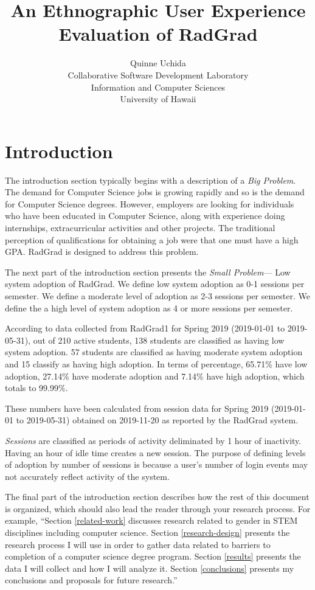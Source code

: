 \documentclass[english]{proposalnsf}
\title{An Ethnographic User Experience Evaluation of RadGrad}
\author{Quinne Uchida \\Collaborative Software Development Laboratory \\ Information and Computer Sciences \\ University of Hawaii}
\begin{document}
\maketitle
\tableofcontents
\newpage

\section{Introduction}
\label{introduction}

The introduction section typically begins with a description of a {\em Big Problem}. The demand for Computer Science jobs is growing rapidly and so is the demand for Computer Science degrees. However, employers are looking for individuals who have been educated in Computer Science, along with experience doing internships, extracurricular activities and other projects. The traditional perception of qualifications for obtaining a job were that one must have a high GPA. RadGrad is designed to address this problem. 

The next part of the introduction section presents the {\em Small Problem}--- Low system adoption of RadGrad. We define low system adoption as 0-1 sessions per semester. We define a moderate level of adoption as 2-3 sessions per semester.  We define the a high level of system adoption as 4 or more sessions per semester. 

According to data collected from RadGrad1 for Spring 2019 (2019-01-01 to 2019-05-31), out of 210 active students, 138 students are classified as having low system adoption. 57 students are classified as having moderate system adoption and 15 classify as having high adoption. In terms of percentage, 65.71{\%} have low adoption, 27.14{\%} have moderate adoption and 7.14{\%} have high adoption, which totals to 99.99{\%}. 

These numbers have been calculated from session data for Spring 2019 (2019-01-01 to 2019-05-31) obtained on 2019-11-20 as reported by the RadGrad system. 

{\em Sessions} are classified as periods of activity deliminated by 1 hour of inactivity. Having an hour of idle time creates a new session. The purpose of defining levels of adoption by number of sessions is because a user's number of login events may not accurately reflect activity of the system.

The final part of the introduction section describes how the rest of this document is organized, which should also lead the reader through your research process.  For example, ``Section \ref{related-work} discusses research related to gender in STEM disciplines including computer science.  Section \ref{research-design} presents the research process I will use in order to gather data related to barriers to completion of a computer science degree program.  Section \ref{results} presents the data I will collect and how I will analyze it.  Section \ref{conclusions} presents my conclusions and proposals for future research.''
\end{document}
